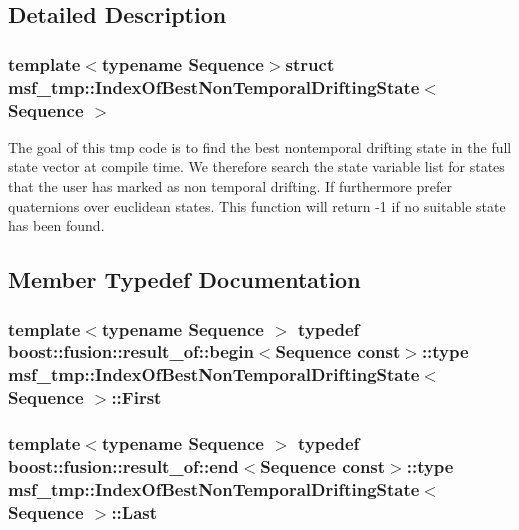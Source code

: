 \subsection{Detailed Description}
\subsubsection*{template$<$typename Sequence$>$struct msf\-\_\-tmp\-::\-Index\-Of\-Best\-Non\-Temporal\-Drifting\-State$<$ Sequence $>$}

The goal of this tmp code is to find the best nontemporal drifting state in the full state vector at compile time. We therefore search the state variable list for states that the user has marked as non temporal drifting. If furthermore prefer quaternions over euclidean states. This function will return -\/1 if no suitable state has been found. 

\subsection{Member Typedef Documentation}
\hypertarget{structmsf__tmp_1_1IndexOfBestNonTemporalDriftingState_a9f25e8cd8a466ed4bc97cd51b6a953e0}{
\subsubsection[{First}]{\setlength{\rightskip}{0pt plus 5cm}template$<$typename Sequence $>$ typedef boost\-::fusion\-::result\-\_\-of\-::begin$<$Sequence const$>$\-::type {\bf msf\-\_\-tmp\-::\-Index\-Of\-Best\-Non\-Temporal\-Drifting\-State}$<$ Sequence $>$\-::{\bf First}}}\label{structmsf__tmp_1_1IndexOfBestNonTemporalDriftingState_a9f25e8cd8a466ed4bc97cd51b6a953e0}
\hypertarget{structmsf__tmp_1_1IndexOfBestNonTemporalDriftingState_a66dd8d7ca1fbe97b50c94896293c952f}{
\subsubsection[{Last}]{\setlength{\rightskip}{0pt plus 5cm}template$<$typename Sequence $>$ typedef boost\-::fusion\-::result\-\_\-of\-::end$<$Sequence const$>$\-::type {\bf msf\-\_\-tmp\-::\-Index\-Of\-Best\-Non\-Temporal\-Drifting\-State}$<$ Sequence $>$\-::{\bf Last}}}\label{structmsf__tmp_1_1IndexOfBestNonTemporalDriftingState_a66dd8d7ca1fbe97b50c94896293c952f}


